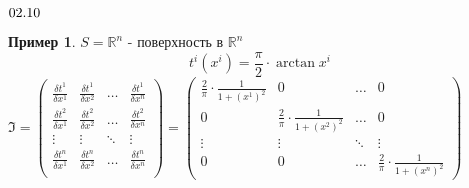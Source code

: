 \documentclass{report}
\theoremstyle{definition}
\newtheorem{example}{Пример}
\begin{document}
\begin{center}
  ${\Large 02.10}$
\end{center}

\begin{example}
  $S = \mathbb{R}^n$ - поверхность в $\mathbb{R}^n$
  \begin{equation*}
    t^i(x^i) = \frac{\pi}{2}\cdot \arctan x^i
  \end{equation*}
  $\mathfrak{I} = \left(\begin{array}{cccc}
        \frac{\delta t^1}{\delta x^1} & \frac{\delta t^1}{\delta x^2} & \ldots & \frac{\delta t^1}{\delta x^n} \\
        \frac{\delta t^2}{\delta x^1} & \frac{\delta t^2}{\delta x^2} & \ldots & \frac{\delta t^2}{\delta x^n} \\
        \vdots                        & \vdots                        & \ddots & \vdots                        \\
        \frac{\delta t^n}{\delta x^1} & \frac{\delta t^n}{\delta x^2} & \ldots & \frac{\delta t^n}{\delta x^n} \\
      \end{array}\right) = \left(\begin{array}{cccc}
        \frac{2}{\pi} \cdot \frac{1}{1 + (x^1)^2} & 0                                         & \ldots & 0                                         \\
        0                                         & \frac{2}{\pi} \cdot \frac{1}{1 + (x^2)^2} & \ldots & 0                                         \\
        \vdots                                    & \vdots                                    & \ddots & \vdots                                    \\
        0                                         & 0                                         & \ldots & \frac{2}{\pi} \cdot \frac{1}{1 + (x^n)^2}
      \end{array}\right)$
\end{example}
\end{document}
